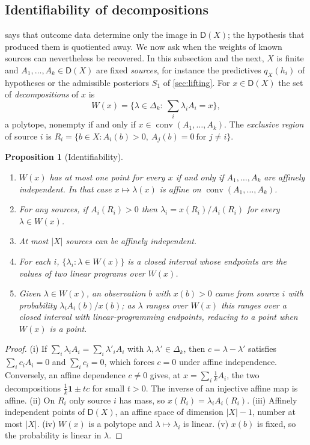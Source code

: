 \documentclass[11pt]{article}
\newtheorem{proposition}[theorem]{Proposition}
\theoremstyle{definition}
\theoremstyle{remark}
\newcommand{\D}{\mathsf{D}}
\begin{document}
\subsection{Identifiability of decompositions}\label{sec:ident}

 says that outcome data determine only the image in $\D(X)$; the hypothesis that
produced them is quotiented away. We now ask when the weights of known sources can nevertheless be
recovered. In this subsection and the next, $X$ is finite and $A_1,\dots,A_k\in\D(X)$ are fixed
\emph{sources}, for instance the predictives $q_X(h_i)$ of hypotheses or the admissible posteriors
$S_1$ of \cref{sec:lifting}. For $x\in\D(X)$ the set of \emph{decompositions} of $x$ is
\[
W(x)=\Big\{\lambda\in\Delta_k:\ \textstyle\sum_i\lambda_iA_i=x\Big\},
\]
a polytope, nonempty if and only if $x\in\operatorname{conv}(A_1,\dots,A_k)$. The \emph{exclusive
region} of source $i$ is $R_i=\{b\in X: A_i(b)>0,\ A_j(b)=0\ \text{for } j\neq i\}$.

\begin{proposition}[Identifiability]\label{prop:ident}
\leavevmode
\begin{enumerate}[label=(\roman*)]
\item $W(x)$ has at most one point for every $x$ if and only if $A_1,\dots,A_k$ are affinely
  independent. In that case $x\mapsto\lambda(x)$ is affine on $\operatorname{conv}(A_1,\dots,A_k)$.
\item For any sources, if $A_i(R_i)>0$ then $\lambda_i=x(R_i)/A_i(R_i)$ for every $\lambda\in W(x)$.
\item At most $|X|$ sources can be affinely independent.
\item For each $i$, $\{\lambda_i:\lambda\in W(x)\}$ is a closed interval whose endpoints are the values
  of two linear programs over $W(x)$.
\item Given $\lambda\in W(x)$, an observation $b$ with $x(b)>0$ came from source $i$ with probability
  $\lambda_iA_i(b)/x(b)$; as $\lambda$ ranges over $W(x)$ this ranges over a closed interval with
  linear-programming endpoints, reducing to a point when $W(x)$ is a point.
\end{enumerate}
\end{proposition}
\begin{proof}
(i) If $\sum_i\lambda_iA_i=\sum_i\lambda'_iA_i$ with $\lambda,\lambda'\in\Delta_k$, then $c=\lambda-\lambda'$
satisfies $\sum_ic_iA_i=0$ and $\sum_ic_i=0$, which forces $c=0$ under affine independence.
Conversely, an affine dependence $c\ne0$ gives, at $x=\sum_i\tfrac1kA_i$, the two decompositions
$\tfrac1k\mathbf{1}\pm tc$ for small $t>0$. The inverse of an injective affine map is affine.
(ii) On $R_i$ only source $i$ has mass, so $x(R_i)=\lambda_iA_i(R_i)$. (iii) Affinely independent points
of $\D(X)$, an affine space of dimension $|X|-1$, number at most $|X|$. (iv) $W(x)$ is a polytope and
$\lambda\mapsto\lambda_i$ is linear. (v) $x(b)$ is fixed, so the probability is linear in $\lambda$.
\end{proof}
\end{document}
